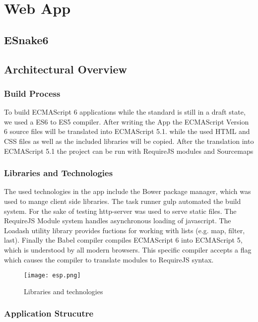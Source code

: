 \documentclass{bioinfo}
\begin{document}
\section{Web App}

\subsection{ESnake6}

\subsection{Architectural Overview}
\subsubsection{Build Process}
To build ECMAScript 6 applications while the standard is still in a draft state, we used a ES6 to ES5 compiler.
After writing the App the ECMAScript Version 6 source files will be translated into ECMAScript 5.1. while the 
used HTML and CSS files as well as the included libraries will be copied. After the translation into ECMAScript 5.1
the project can be run with RequireJS modules and Sourcemaps %
\subsubsection{Libraries and Technologies}
The used technologies in the app include the Bower package manager, which was used to mange client side libraries. The task runner gulp automated the build system.
For the sake of testing http-server was used to serve static files. The RequireJS Module system handles asynchronous loading of javascript. The Loadash utility library
provides fuctions for working with lists (e.g. map, filter, last). Finally the Babel compiler compiles ECMAScript 6 into ECMAScript 5, which is understood by all modern browsers.
This specific compiler accepts a flag which causes the compiler to translate modules to RequireJS syntax.

\begin{figure}[!tpb]%
\centerline{\texttt{[image: esp.png]}}
\caption{Libraries and technologies}\label{fig:01}
\end{figure}


\subsubsection{Application Strucutre}
\end{document}
